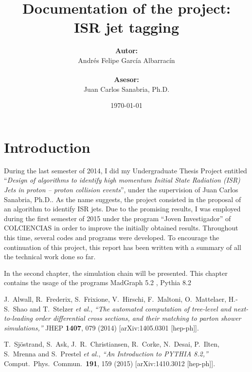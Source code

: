 \documentclass[12pt, oneside]{book}              %
\title{\bf Documentation of the project: \\ ISR jet tagging}
\author{\textbf{Autor:}\\ Andr\'es Felipe Garc\'ia Albarrac\'in \\ \\ \textbf{Asesor:} \\ Juan Carlos Sanabria, Ph.D.}
\date{\today}
\begin{document}
	\frontmatter                            %
	\maketitle                              %
	\tableofcontents                        %
	\mainmatter                             %

\chapter{Introduction}

During the last semester of 2014, I did my Undergraduate Thesis Project entitled ``\textit{Design of algorithms to 
identify high momentum Initial State Radiation (ISR) Jets in proton – proton collision events}'', under the supervision 
of Juan Carlos Sanabria, Ph.D.. As the name suggests, the project consisted in the proposal of an algorithm to identify
ISR jets. Due to the promising results, I was employed during the first semester of 2015 under the program ``Joven 
Investigador'' of COLCIENCIAS in order to improve the initially obtained results. Throughout this time, several codes
and programs were developed. To encourage the continuation of this project, this report has been written with a 
summary of all the technical work done so far.

In the second chapter, the simulation chain will be presented. This chapter contains the usage of the programs
MadGraph 5.2 \cite{MadGraph}, Pythia 8.2 

\begin{thebibliography}{99}

	  J.~Alwall, R.~Frederix, S.~Frixione, V.~Hirschi, F.~Maltoni, O.~Mattelaer, H.-S.~Shao and T.~Stelzer {\it et al.},
	  \emph{``The automated computation of tree-level and next-to-leading order differential cross sections, and their matching to parton shower simulations,''}
	  JHEP {\bf 1407}, 079 (2014)
	  [arXiv:1405.0301 [hep-ph]].
	  
	  T.~Sjöstrand, S.~Ask, J.~R.~Christiansen, R.~Corke, N.~Desai, P.~Ilten, S.~Mrenna and S.~Prestel {\it et al.},
	  \emph{``An Introduction to PYTHIA 8.2,''}
	  Comput.\ Phys.\ Commun.\  {\bf 191}, 159 (2015)
	  [arXiv:1410.3012 [hep-ph]].
	  

\end{thebibliography}
	
\end{document}
